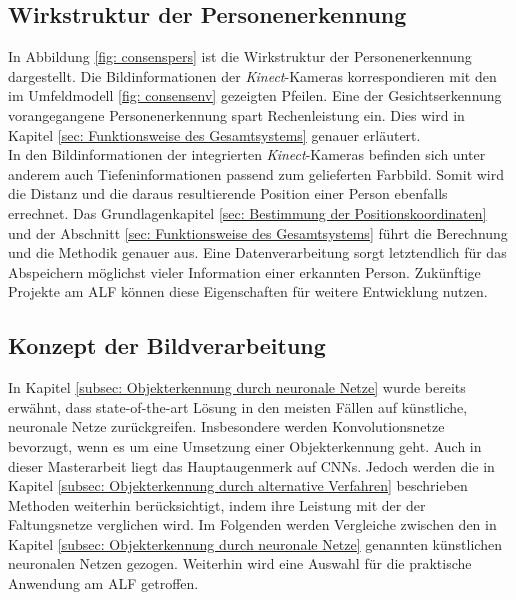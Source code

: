 		\subsection{Wirkstruktur der Personenerkennung}
		\label{subsec: Wirkstrukur Personenerkennung}
		
		
		
		
	
		In Abbildung \ref{fig: consenspers} ist die Wirkstruktur der Personenerkennung dargestellt. Die Bildinformationen der \textit{Kinect}-Kameras korrespondieren mit den im Umfeldmodell \ref{fig: consensenv} gezeigten Pfeilen. Eine der Gesichtserkennung vorangegangene Personenerkennung spart Rechenleistung ein. Dies wird in Kapitel \ref{sec: Funktionsweise des Gesamtsystems} genauer erläutert.\\
		
		In den Bildinformationen der integrierten \textit{Kinect}-Kameras befinden sich unter anderem auch Tiefeninformationen passend zum gelieferten Farbbild. Somit wird die Distanz und die daraus resultierende Position einer Person ebenfalls errechnet. Das Grundlagenkapitel \ref{sec: Bestimmung der Positionskoordinaten} und der Abschnitt \ref{sec: Funktionsweise des Gesamtsystems} führt die Berechnung und die Methodik genauer aus. Eine Datenverarbeitung sorgt letztendlich für das Abspeichern möglichst vieler Information einer erkannten Person. Zukünftige Projekte am ALF können diese Eigenschaften für weitere Entwicklung nutzen.\\   
		
		\subsection{Konzept der Bildverarbeitung}
		\label{subsec: Auswahl und Training der verwendeten neuronalen Netze}
		
		In Kapitel \ref{subsec: Objekterkennung durch neuronale Netze} wurde bereits erwähnt, dass state-of-the-art Lösung in den meisten Fällen auf künstliche, neuronale Netze zurückgreifen. Insbesondere werden Konvolutionsnetze bevorzugt, wenn es um eine Umsetzung einer Objekterkennung geht. Auch in dieser Masterarbeit liegt das Hauptaugenmerk auf CNNs. Jedoch werden die in Kapitel \ref{subsec: Objekterkennung durch alternative Verfahren} beschrieben Methoden weiterhin berücksichtigt, indem ihre Leistung mit der der Faltungsnetze verglichen wird. Im Folgenden werden Vergleiche zwischen den in Kapitel \ref{subsec: Objekterkennung durch neuronale Netze} genannten künstlichen neuronalen Netzen gezogen. Weiterhin wird eine Auswahl für die praktische Anwendung am ALF getroffen. \\
		
